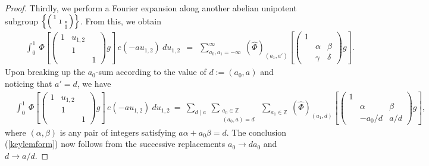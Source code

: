 \documentclass[11pt,reqno]{amsart}
\theoremstyle{definition}
\theoremstyle{definition}
\theoremstyle{remark}
\newcommand{\Z}{\ensuremath{\mathbb{Z}}}
\numberwithin{equation}{section}
\begin{document}
\begin{proof}
 	Thirdly, we perform a Fourier expansion along another abelian unipotent subgroup
 	$\left\{ \begin{psmallmatrix}
 		1 &     &    \\
 		& 1  & *  \\
 		&     & 1
 	\end{psmallmatrix}\right\}$. From this, we obtain 	\vspace{-0.2in} 
 	\begin{align}
 \hspace{25pt} 	\int_{0}^{1} \ \Phi\left[
 	\begin{pmatrix}
 		1 & u_{1,2} &  \\
 		& 1          & \\
 		&             & 1
 	\end{pmatrix} g\right] \, e( -a u_{1,2}) \ du_{1,2} 
 	\ \  =  \ \  
 	\sum_{a_{0},a_{1}=-\infty}^{\infty} \ \left(\widehat{\Phi}\right)_{(a_{1}, a')}\left[\begin{pmatrix}
 		1 &            &         \\
 		& \alpha & \beta \\
 		& \gamma  & \delta
 	\end{pmatrix}
 	g\right]. 
 \end{align}
  Upon breaking up the $a_{0}$-sum according to the value of $d:=(a_{0}, a)$ and noticing that $a'=d$, we have
   \vspace{-0.2in} 
  	\begin{align}
\hspace{10pt}	\int_{0}^{1} \ \Phi\left[
  	\begin{pmatrix}
  		1 & u_{1,2} &  \\
  		& 1          & \\
  		&             & 1
  	\end{pmatrix} g\right]\,   e( -a u_{1,2}) \ du_{1,2}  
  	\  =   \   \sum_{d\mid a} \ \sum_{\substack{a_{0}\in \Z \\ (a_{0},a )=d}} \ 
  	\sum_{a_{1}\in \Z} \ \left(\widehat{\Phi}\right)_{(a_{1}, d)}\left[\begin{pmatrix}
  		1 &            &         \\
  		& \alpha & \beta \\
  		& -a_{0}/d & a/d
  	\end{pmatrix}
  	g\right],
  \end{align}
  where $(\alpha, \beta)$ is any pair of integers satisfying $a\alpha+ a_{0}\beta =d$.  The conclusion (\ref{keylemform}) now follows from  the successive replacements $a_{0} \to da_{0}$ and   $d \to a/d$.
 
 \end{proof}
 
\end{document}
